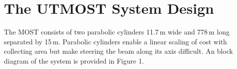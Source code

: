 \section{The UTMOST System Design}

The MOST consists of two parabolic cylinders 11.7\,m wide and 778\,m long separated by 15\,m. Parabolic cylinders enable a linear scaling of cost with collecting area but make steering the beam along its axis difficult. An block diagram of the system is provided in Figure 1. 
